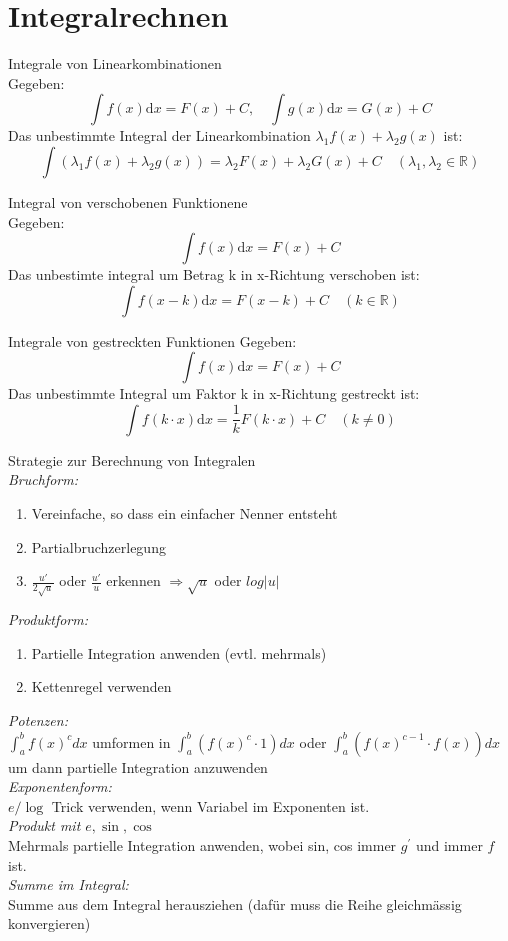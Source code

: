 
\section{Integralrechnen}



\begin{definition}{Integrale von Linearkombinationen}\\
	Gegeben:
	\[\int{f(x)\mathrm{d}x} = F(x)+C, \quad  \int{g(x)\mathrm{d}x} = G(x)+C\]
	Das unbestimmte Integral der Linearkombination \(\lambda_1f(x) + \lambda_2g(x)\) ist:
	\[\int{(\lambda_1f(x)+\lambda_2g(x))} = \lambda_2F(x)+\lambda_2G(x)+C \quad (\lambda_1,\lambda_2 \in \mathbb{R} )\]
\end{definition}
\begin{definition}{Integral von verschobenen Funktionene}\\
	Gegeben:
	\[\int{f(x)\mathrm{d}x} = F(x) + C \]
	Das unbestimte integral um Betrag k in x-Richtung verschoben ist:
	\[\int{f(x-k)\mathrm{d}x}= F(x-k)+C \quad (k \in \mathbb{R}) \]
\end{definition}
\begin{definition}{Integrale von gestreckten Funktionen}
	Gegeben:
	\[\int{f(x)\mathrm{d}x} = F(x)+C \]
	Das unbestimmte Integral um Faktor k in x-Richtung gestreckt ist:
	\[\int{f(k\cdot x)\mathrm{d}x}= \frac{1}{k}F(k\cdot x)+C \quad (k\neq0 )\]
\end{definition}

\begin{KR}{Strategie zur Berechnung von Integralen}
    \\\emph{Bruchform:}
    \begin{enumerate}
        \item Vereinfache, so dass ein einfacher Nenner entsteht
        \item Partialbruchzerlegung
        \item $\frac{u'}{2\sqrt{u}}$ oder $\frac{u'}{u}$ erkennen $\Rightarrow \sqrt{u}$ oder $log|u|$
    \end{enumerate}
    \emph{Produktform:}
    \begin{enumerate}
        \item Partielle Integration anwenden (evtl. mehrmals)
        \item Kettenregel verwenden
    \end{enumerate}
    \emph{Potenzen:}\\
        $\int_{a}^{b} f(x)^{c} d x$ umformen in $\int_{a}^{b}(f(x)^{c} \cdot 1) d x$ oder $\int_{a}^{b}(f(x)^{c-1} \cdot f(x)) d x$ um dann partielle Integration anzuwenden\\
    \emph{Exponentenform:}\\
        $e / \log$ Trick verwenden, wenn Variabel im Exponenten ist.\\
    \emph{Produkt mit $e, \sin , \cos$}\\
        Mehrmals partielle Integration anwenden, wobei sin, cos immer $g^{\prime}$ und immer $f$ ist.\\
    \emph{Summe im Integral:}\\
        Summe aus dem Integral herausziehen (dafür muss die Reihe gleichmässig konvergieren)
\end{KR}

